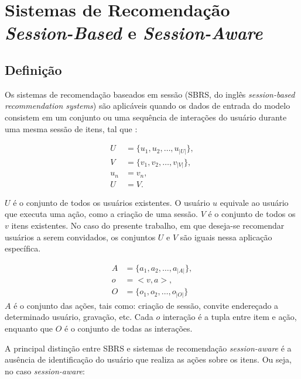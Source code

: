 \section{Sistemas de Recomendação \textit{Session-Based} e \textit{Session-Aware}}

\subsection{Definição}

Os sistemas de recomendação baseados em sessão (SBRS, do inglês
 \textit{session-based recommendation systems}) são aplicáveis quando os dados
 de entrada do modelo consistem em um conjunto ou uma sequência de interações do usuário
 durante uma mesma sessão de itens, tal que \cite{survey_wang_2021}:

 \begin{equation*}
  \begin{aligned}
  U & = \{u_1, u_2, \ldots, u_{|U|}\}, \\
  V & = \{v_1, v_2, \ldots, v_{|V|}\}, \\
  u_n & = v_n, \\
  U & = V.
\end{aligned}
\end{equation*}

$U$ é o conjunto de todos os usuários existentes. O usuário $u$ equivale ao
usuário que executa uma ação, como a criação de uma sessão. $V$ é o conjunto de
todos os $v$ itens existentes. No caso do presente trabalho, em que deseja-se
recomendar usuários a serem convidados, os conjuntos $U$ e $V$ são iguais nessa
aplicação específica.

\begin{equation*}
  \begin{aligned}
  A & = \{a_1, a_2, \ldots, a_{|A|}\}, \\
  o & = <v, a>, \\
  O & = \{o_1, o_2, \ldots, o_{|O|}\}
  \end{aligned}
  \end{equation*}
$A$ é o conjunto das ações, tais como: criação de sessão, convite endereçado a
  determinado usuário, gravação, etc. Cada $o$ interação é a tupla entre item e
  ação, enquanto que $O$ é o conjunto de todas as interações.

  A principal distinção entre SBRS e sistemas de recomendação \textit{session-aware}
  é a ausência de identificação do usuário que realiza as ações sobre os itens.
  Ou seja, no caso \textit{session-aware}:

